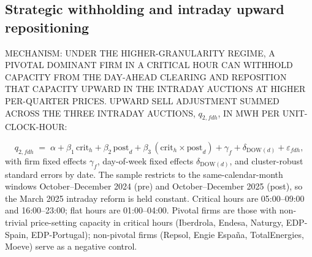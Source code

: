 \documentclass[11pt,a4paper]{article}
\begin{document}
\subsection{Strategic withholding and intraday upward repositioning}\label{sec:results:q2}

MECHANISM: UNDER THE HIGHER-GRANULARITY REGIME, A PIVOTAL DOMINANT FIRM IN A CRITICAL HOUR CAN WITHHOLD CAPACITY FROM THE DAY-AHEAD CLEARING AND REPOSITION THAT CAPACITY UPWARD IN THE INTRADAY AUCTIONS AT HIGHER PER-QUARTER PRICES. UPWARD SELL ADJUSTMENT SUMMED ACROSS THE THREE INTRADAY AUCTIONS, $q_{2,fdh}$, IN MWH PER UNIT-CLOCK-HOUR:

\begin{equation}\label{eq:B1}
   q_{2,fdh} \;=\; \alpha + \beta_1\,\mathrm{crit}_h + \beta_2\,\mathrm{post}_d + \beta_3\,(\mathrm{crit}_h \times \mathrm{post}_d) + \gamma_f + \delta_{\mathrm{DOW}(d)} + \varepsilon_{fdh},
\end{equation}
with firm fixed effects $\gamma_f$, day-of-week fixed effects $\delta_{\mathrm{DOW}(d)}$, and cluster-robust standard errors by date. The sample restricts to the same-calendar-month windows October--December 2024 (pre) and October--December 2025 (post), so the March 2025 intraday reform is held constant. Critical hours are 05:00--09:00 and 16:00--23:00; flat hours are 01:00--04:00. Pivotal firms are those with non-trivial price-setting capacity in critical hours (Iberdrola, Endesa, Naturgy, EDP-Spain, EDP-Portugal); non-pivotal firms (Repsol, Engie Espa\~na, TotalEnergies, Moeve) serve as a negative control.
\end{document}
